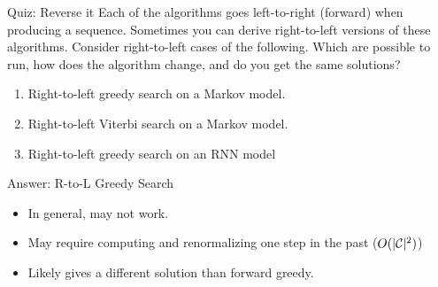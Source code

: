 \documentclass{beamer}
\begin{document}
\begin{frame}{Quiz: Reverse it}
  Each of the algorithms goes left-to-right (forward) when producing 
  a sequence. Sometimes you can derive right-to-left versions 
  of these algorithms. Consider right-to-left cases of the 
  following. Which are possible to run, how does the algorithm change, and 
  do you get the same solutions?

  \begin{enumerate}
  \item Right-to-left greedy search on a Markov model.
  \item Right-to-left Viterbi search on a Markov model.
  \item Right-to-left greedy search on an RNN model
  \end{enumerate}

\end{frame}

\begin{frame}{Answer: R-to-L Greedy Search}
  \begin{itemize}
  \item In general, may not work. 
    
  \item May require computing and renormalizing one step in the past ($O(|\mathcal{C}|^2)$)

  \item Likely gives a different solution than forward greedy. 
  \end{itemize}

  \begin{center}
    \begin{algorithmic}
        
       
      \EndFor{}
      \EndProcedure{}
    \end{algorithmic}
  \end{center}
\end{frame}
\end{document}
